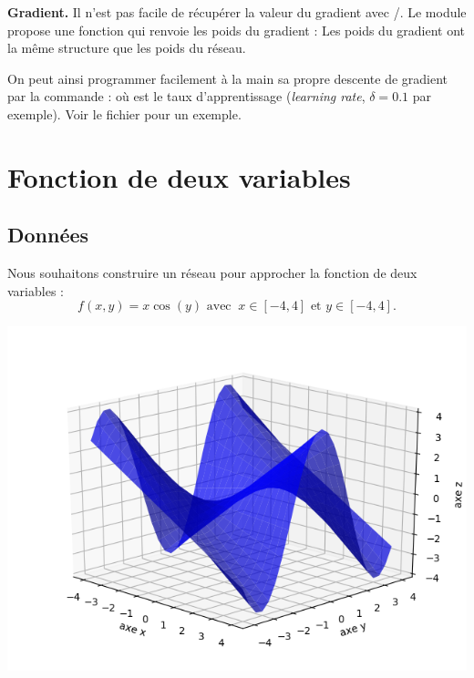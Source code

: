 \documentclass[11pt,class=report,crop=false]{standalone}
\begin{document}
\bigskip
\textbf{Gradient.}
Il n'est pas facile de récupérer la valeur du gradient avec \tensorflow/\keras.
Le module  propose une fonction  qui renvoie les poids du gradient :
Les poids du gradient ont la même structure que les poids du réseau.

On peut ainsi programmer facilement à la main sa propre descente de gradient par la commande :
où  est le taux d'apprentissage (\emph{learning rate}, $\delta=0.1$ par exemple).
Voir le fichier  pour un exemple.


\section{Fonction de deux variables}

\subsection{Données}
Nous souhaitons construire un réseau pour approcher la fonction de deux variables :
$$f(x,y) = x\cos(y) \text{ avec } \  x \in [-4,4] \text{ et } y \in [-4,4].$$
\begin{center}
\includegraphics[scale=\myscale,scale=0.5]{figures/tf2-deuxvar-fonction}
\end{center}
\end{document}
